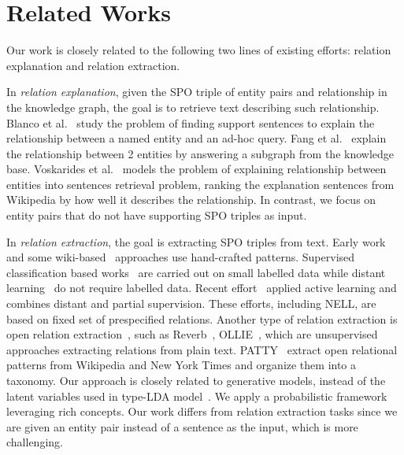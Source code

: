 \section{Related Works}
\label{sec:rel}

Our work is closely related to the following two lines of existing efforts: relation explanation and relation extraction.

In \emph{relation explanation}, given the SPO triple of entity pairs and relationship in the knowledge graph, the goal is to retrieve text describing such relationship.
Blanco et al.~\cite{blanco2010finding} study the problem of finding support sentences to explain the relationship between a named entity and an ad-hoc query.
Fang et al.~\cite{fang2011rex} explain the relationship between 2 entities by answering a subgraph from the knowledge base.
Voskarides et al.~\cite{voskarideslearning} models the problem of explaining relationship between entities into sentences retrieval problem, ranking the explanation sentences from Wikipedia by how well it describes the relationship.
In contrast, we focus on entity pairs that do not have supporting SPO triples as input.

In \emph{relation extraction}, the goal is extracting SPO triples from text.
Early work~\cite{hearst1992automatic,brin1999extracting,agichtein2000snowball} and some wiki-based~\cite{ponzetto2008wikitaxonomy} approaches use hand-crafted patterns.
Supervised classification based works~\cite{doddington2004automatic,guodong2005exploring} are carried out on small labelled data while distant learning~\cite{craven1999constructing,wu2007autonomously,bunescu2007learning,mintz2009distant} do not require labelled data.
Recent effort~\cite{angeli2014combining} applied active learning and combines distant and partial supervision.
These efforts, including NELL, are based on fixed set of prespecified relations.
Another type of relation extraction is open relation extraction~\cite{banko2007open}, such as Reverb~\cite{fader2011identifying}, OLLIE~\cite{schmitz2012open}, which are unsupervised approaches extracting relations from plain text.
PATTY~\cite{nakashole2012patty} extract open relational patterns from Wikipedia and New York Times and organize them into a taxonomy.
Our approach is closely related to generative models, instead of the latent variables used in type-LDA model~\cite{yao2011structured}. 
We apply a probabilistic framework leveraging rich concepts.
Our work differs from relation extraction tasks since we are given an entity pair instead of a sentence as the input, which is more challenging.

